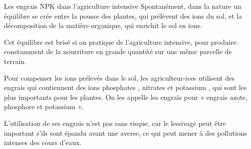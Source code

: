 \begin{doc}{Les engrais NPK dans l'agriculture intensive}
  Spontanément, dans la nature un équilibre se crée entre la pousse des plantes, qui prélèvent des ions du sol, et la décomposition de la matière organique, qui enrichit le sol en ions.

  Cet équilibre est brisé si on pratique de l'agriculture intensive, pour produire constamment de la nourriture en grande quantité sur une même parcelle de terrain. 
  \begin{importants}
    Pour compenser les ions prélevés dans le sol, les agriculteur-ices utilisent des engrais qui contiennent des ions phosphates \ionPhosphate, nitrates \nitrate et potassium \ionPotassium, qui sont les plus importants pour les plantes.
    On les appelle les engrais  pour « engrais azote, phosphore et potassium ».
  \end{importants}
  
  L'utilisation de ses engrais n'est pas sans risque, car le lessivage peut être important s'ils sont épandu avant une averse, ce qui peut mener à des pollutions intenses des cours d'eaux.

  
  


\end{doc}
